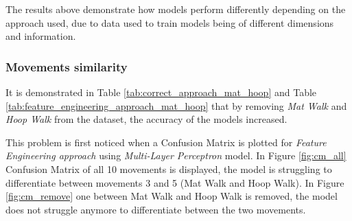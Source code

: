             The results above demonstrate how models perform differently depending on the approach used, due to data used to train models being of different dimensions and information. 

        \subsubsection{Movements similarity}   
        
            It is demonstrated in Table \ref{tab:correct_approach_mat_hoop} and Table \ref{tab:feature_engineering_approach_mat_hoop} that by removing \textit{Mat Walk} and \textit{Hoop Walk} from the dataset, the accuracy of the models increased.

            This problem is first noticed when a Confusion Matrix is plotted for \textit{Feature Engineering approach} using \textit{Multi-Layer Perceptron} model. In Figure \ref{fig:cm_all} Confusion Matrix of all 10 movements is displayed, the model is struggling to differentiate between movements 3 and 5 (Mat Walk and Hoop Walk). In Figure \ref{fig:cm_remove} one between Mat Walk and Hoop Walk is removed, the model does not struggle anymore to differentiate between the two movements.
            
